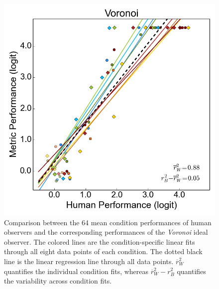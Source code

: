 \documentclass[12pt]{article}
\begin{document}
\begin{figure}[h!]
\includegraphics{Figures/FIG_predict_Voronoi_exp1.png}
\caption{Comparison between the 64 mean condition performances of human observers and the corresponding performances of the \emph{Voronoi} ideal observer. The colored lines are the condition-specific linear fits through all eight data points of each condition. The dotted black line is the linear regression line through all data points. $\overline{r}^{2}_W$ quantifies the individual condition fits, whereas $\overline{r}^{2}_W-r^{2}_B$ quantifies the variability across condition fits.}
\label{fig_predict_voronoi_exp1}
\end{figure}
\end{document}
